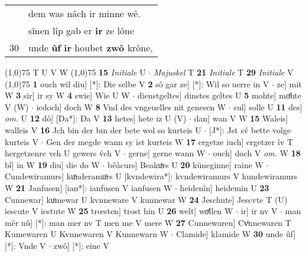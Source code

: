 \documentclass[8pt,a4paper,notitlepage]{article}
\begin{document}
\begin{table}[ht]
\begin{minipage}[t]{0.5\linewidth}
\begin{tabular}{rl}
 & dem was nâch ir minne wê.\\ 
 & sînen lîp gab er \textbf{ir} ze lône\\ 
30 & unde \textbf{ûf} \textbf{ir} houbet \textbf{zwô} krône,\\ 
\end{tabular}
\scriptsize
\line(1,0){75} \newline
T U V W \newline
\line(1,0){75} \newline
\textbf{15} \textit{Initiale} U   $\cdot$ \textit{Majuskel} T  \textbf{21} \textit{Initiale} T  \textbf{29} \textit{Initiale} V  \newline
\line(1,0){75} \newline
\textbf{1} ouch wil diu] [*]: Die selbe V \textbf{2} sô gar ze] [*]: Wil so uerre in V  $\cdot$ ze] mit W \textbf{3} sir] ir sy W \textbf{4} swie] Wie U W  $\cdot$ dienstgeltes] dinstes geltes U \textbf{5} mohte] moͤhte V (W)  $\cdot$ iedoch] doch W \textbf{8} Vnd des vngeuelles nit genesen W  $\cdot$ sul] solle U \textbf{11} des] \textit{om.} U \textbf{12} dô] [Da*]: Da V \textbf{13} hetes] hete iz U (V)  $\cdot$ dan] wan V W \textbf{15} Waleis] walleis V \textbf{16} Jch bin der bin der bete wol so kurteis U  $\cdot$ [J*]: Jst sv́ bette volge kurteis V  $\cdot$ Gen der megde wann sy ist kurteis W \textbf{17} ergetze iuch] ergetzer îv T hergetzenre vch U gewers v́ch V  $\cdot$ gerne] gerne wann W  $\cdot$ ouch] doch V \textit{om.} W \textbf{18} bî] in W \textbf{19} diu] die do W  $\cdot$ bêâcurs] Beakuͦrs U \textbf{20} küneginne] raine W  $\cdot$ Cundewiramurs] kuͦnderamuͦrs U [kvndewira*]: kvndewiramurs V kundewiramurs W \textbf{21} Janfusen] [ian*]: ianfusen V ianfusen W  $\cdot$ heidenîn] heidemin U \textbf{23} Cunnewar] kuͦmewar U kvnneware V kunnewar W \textbf{24} Jeschute] Jescvte T (U) iescute V iestute W \textbf{25} trœsten] trost hin U \textbf{26} welt] woͤllen W  $\cdot$ ir] ir nv V  $\cdot$ man mêr nû] [*]: man mer nv T men me V mere W \textbf{27} Cunnewaren] Cvͦnnewaren T Kumewaren U Kvnnewaren V Kunnewarn W  $\cdot$ Clamide] klamide W \textbf{30} unde ûf] [*]: Vnde V  $\cdot$ zwô] [*]: eine V \newline
\end{minipage}
\end{table}
\end{document}

